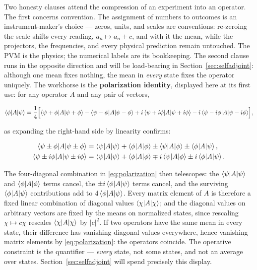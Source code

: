 Two honesty clauses attend the compression of an experiment into an operator. The first concerns convention. The assignment of numbers to outcomes is an instrument-maker's choice --- zeros, units, and scales are conventions: re-zeroing the scale shifts every reading, $a_n\mapsto a_n+c$, and with it the mean, while the projectors, the frequencies, and every physical prediction remain untouched. The PVM is the physics; the numerical labels are its bookkeeping. The second clause runs in the opposite direction and will be load-bearing in Section~\ref{sec:selfadjoint}: although one mean fixes nothing, the mean in \emph{every} state fixes the operator uniquely. The workhorse is the \textbf{polarization identity}, displayed here at its first use: for any operator $A$ and any pair of vectors,
\begin{linenomath}
\begin{equation}
    \braket{\phi|A|\psi}
    =\frac14\Bigl[
        \braket{\psi+\phi|A|\psi+\phi}
        -\braket{\psi-\phi|A|\psi-\phi}
        +i\braket{\psi+i\phi|A|\psi+i\phi}
        -i\braket{\psi-i\phi|A|\psi-i\phi}
    \Bigr],
    \label{eq:polarization}
\end{equation}
\end{linenomath}
as expanding the right-hand side by linearity confirms:
\begin{linenomath}
\begin{align}
    \braket{\psi\pm\phi|A|\psi\pm\phi}
    &= \braket{\psi|A|\psi} + \braket{\phi|A|\phi} \pm \braket{\psi|A|\phi} \pm \braket{\phi|A|\psi},\\
    \braket{\psi\pm i\phi|A|\psi\pm i\phi}
    &= \braket{\psi|A|\psi} + \braket{\phi|A|\phi} \mp i\braket{\psi|A|\phi} \pm i\braket{\phi|A|\psi}.
\end{align}
\end{linenomath}
The four-diagonal combination in \eqref{eq:polarization} then telescopes: the $\braket{\psi|A|\psi}$ and $\braket{\phi|A|\phi}$ terms cancel, the $\pm i\braket{\phi|A|\psi}$ terms cancel, and the surviving $\braket{\phi|A|\psi}$ contributions add to $4\braket{\phi|A|\psi}$. Every matrix element of $A$ is therefore a fixed linear combination of diagonal values $\braket{\chi|A|\chi}$; and the diagonal values on arbitrary vectors are fixed by the means on normalized states, since rescaling $\chi\mapsto c\chi$ rescales $\braket{\chi|A|\chi}$ by $|c|^2$. If two operators have the same mean in every state, their difference has vanishing diagonal values everywhere, hence vanishing matrix elements by \eqref{eq:polarization}: the operators coincide. The operative constraint is the quantifier --- \emph{every} state, not some states, and not an average over states. Section~\ref{sec:selfadjoint} will spend precisely this display.

